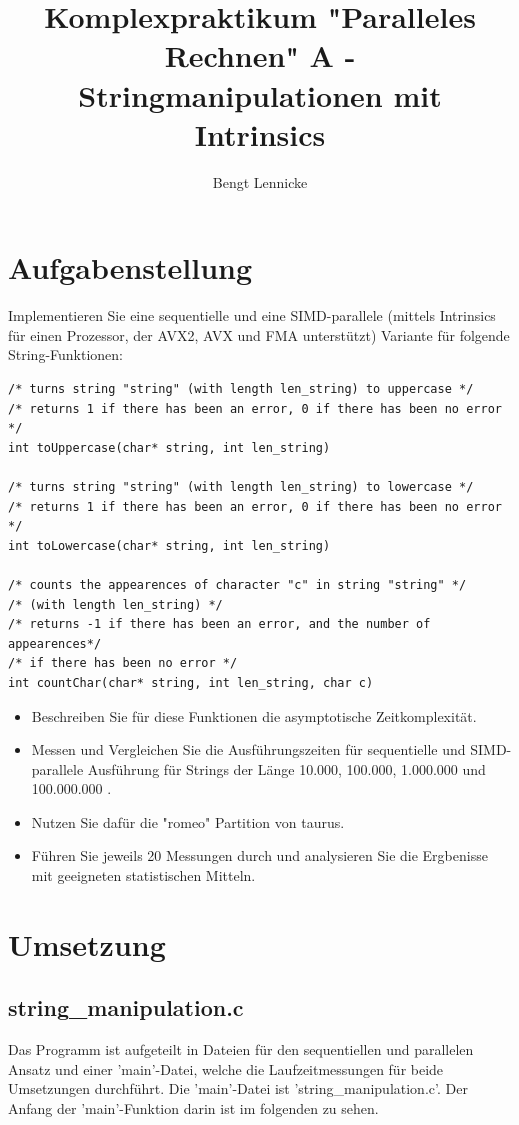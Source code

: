 \documentclass[plainarticle,zihtitle,german,final,hyperref,utf8]{zihpub}
\author{Bengt Lennicke}
\title{Komplexpraktikum "Paralleles Rechnen" \newline A - Stringmanipulationen mit Intrinsics}
\begin{document}
\section{Aufgabenstellung}

Implementieren Sie eine sequentielle und eine SIMD-parallele (mittels Intrinsics für einen Prozessor, der AVX2, AVX und FMA unterstützt) Variante für folgende String-Funktionen:
\begin{verbatim}
/* turns string "string" (with length len_string) to uppercase */
/* returns 1 if there has been an error, 0 if there has been no error */
int toUppercase(char* string, int len_string)

/* turns string "string" (with length len_string) to lowercase */
/* returns 1 if there has been an error, 0 if there has been no error */
int toLowercase(char* string, int len_string)

/* counts the appearences of character "c" in string "string" */
/* (with length len_string) */
/* returns -1 if there has been an error, and the number of appearences*/
/* if there has been no error */
int countChar(char* string, int len_string, char c)
\end{verbatim}
\begin{itemize}
	\item Beschreiben Sie für diese Funktionen die asymptotische Zeitkomplexität.
	\item Messen und Vergleichen Sie die Ausführungszeiten für sequentielle und SIMD-parallele Ausführung für Strings der Länge 10.000, 100.000, 1.000.000 und 100.000.000 .
	\item Nutzen Sie dafür die "romeo" Partition von taurus.
	\item Führen Sie jeweils 20 Messungen durch und analysieren Sie die Ergbenisse mit geeigneten statistischen Mitteln.
	
\end{itemize}

\section{Umsetzung}
\subsection{string\_manipulation.c}
Das Programm ist aufgeteilt in Dateien für den sequentiellen und parallelen Ansatz und einer 'main'-Datei, welche die Laufzeitmessungen für beide Umsetzungen durchführt. Die 'main'-Datei ist 'string\_manipulation.c'. Der Anfang der 'main'-Funktion darin ist im folgenden zu sehen.
\end{document}
